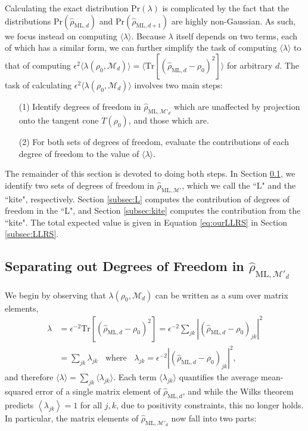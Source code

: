\documentclass[aps,pra, twocolumn]{revtex4-1}
\newcommand{\M}{\mathcal{M}}
\newcommand{\expect}[1]{\ensuremath{\left\langle#1\right\rangle}}
\newcommand{\rhohat}{\hat{\rho}}
\newcommand{\rhoML}[1]{\rhohat_{\scriptscriptstyle{\mathrm{ML},#1}}}
\begin{document}
Calculating the exact distribution $\mathrm{Pr}(\lambda)$ is complicated by the fact that the distributions $\mathrm{Pr}(\rhoML{d})$ and $\mathrm{Pr}(\rhoML{d+1})$ are highly non-Gaussian. As such, we focus instead on computing $\langle \lambda \rangle$.
Because $\lambda$ itself depends on two terms, each of which has a similar form, we can further simplify the task of computing $\langle \lambda \rangle$ to that of computing $\epsilon^{2}\langle \lambda(\rho_{0}, \M_{d}) \rangle = \langle \mathrm{Tr}[(\rhoML{d}  - \rho_{0})^{2}] \rangle$ for arbitrary $d$.
The task of calculating $\epsilon^{2}\langle \lambda(\rho_{0}, \M_{d})\rangle$ involves two main steps:
\begin{itemize}
\item[(1)] Identify degrees of freedom in $\rhoML{\M'_{d}}$ which are unaffected by projection onto the tangent cone $T(\rho_{0})$, and those which are.
\item[(2)] For both sets of degrees of freedom, evaluate the contributions of each degree of freedom to the value of $\langle \lambda \rangle$.
\end{itemize}

The remainder of this section is devoted to doing both steps. In Section \ref{subsec:dof}, we identify two sets of degrees of freedom in $\rhoML{\M'}$, which we call the ``L" and the ``kite", respectively. Section \ref{subsec:L} computes the contribution of degrees of freedom in the ``L", and Section \ref{subsec:kite} computes the contribution from the ``kite". The total expected value is given in Equation \eqref{eq:ourLLRS} in Section \ref{subsec:LLRS}.

\subsection{Separating out Degrees of Freedom in $\rhoML{\M'_{d}}$}
\label{subsec:dof}
We begin by observing that $\lambda(\rho_{0}, \M_{d})$ can be written as a sum over matrix elements,
\begin{align}
\label{eq:llrserrors}
\nonumber \lambda &=\epsilon^{-2}\mathrm{Tr}[(\rhoML{d} - \rho_{0})^{2}] = \epsilon^{-2}\sum_{jk}|(\rhoML{d}- \rho_{0} )_{jk}|^{2}\\
&= \sum_{jk}\lambda_{jk}~~~~\text{where}~~~~\lambda_{jk} = \epsilon^{-2}|(\rhoML{d} - \rho_{0} )_{jk} |^{2},
\end{align}
and therefore $\langle \lambda \rangle = \sum_{jk}\langle\lambda_{jk}\rangle$.  Each term $\langle \lambda_{jk}\rangle$ quantifies the average mean-squared error of a single matrix element of $\rhoML{d}$, and while the Wilks theorem predicts $\expect{\lambda_{jk}}=1$ for all $j,k$, due to positivity constraints, this no longer holds. In particular, the matrix elements of $\rhoML{\M'_{d}}$ now fall into two parts:
\end{document}
